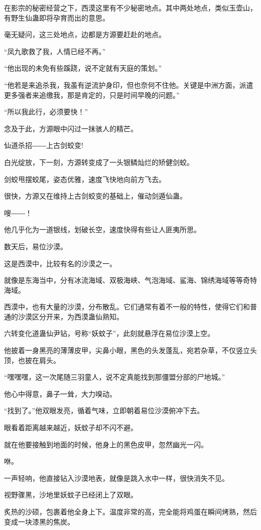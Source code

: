 \begin{this_body}
在影宗的秘密经营之下，西漠这里有不少秘密地点。其中两处地点，类似玉壶山，有野生仙蛊即将孕育而出的意思。

毫无疑问，这三处地点，边都是方源要赶赴的地点。

“凤九歌救了我，人情已经不再。”

“他出现的未免有些蹊跷，说不定就有天庭的策划。”

“他若是来追杀我，我虽有逆流护身印，但也奈何不住他。关键是中洲方面，派遣更多强者来追缴我，那是肯定的，只是时间早晚的问题。”

“所以我此行，必须要快！”

念及于此，方源眼中闪过一抹骇人的精芒。

仙道杀招――上古剑蛟变!

白光绽放，下一刻，方源转变成了一头银鳞灿烂的矫健剑蛟。

剑蛟甩摆蛟尾，姿态优雅，速度飞快地向前方飞去。

很快，方源又在维持上古剑蛟变的基础上，催动剑遁仙蛊。

嗖――！

他几乎化为一道银线，划破长空，速度快得有些让人匪夷所思。

数天后，易位沙漠。

这是西漠中，比较有名的沙漠之一。

就像是东海当中，分有冰流海域、双极海峡、气泡海域、鲨海、锦绣海域等等奇特海域。

西漠中，也有大量的沙漠，分布散乱。它们通常有着不一般的特性，使得它们和普通的沙漠区分开来，为西漠蛊仙熟知。

六转变化道蛊仙尹钻，号称“妖蚊子”，此刻就悬浮在易位沙漠上空。

他披着一身黑亮的薄薄皮甲，尖鼻小眼，黑色的头发蓬乱，宛若杂草，不仅竖立头顶，也披在肩头。

“嘿嘿嘿，这一次尾随三羽童人，说不定真能找到那僵盟分部的尸地城。”

他心中得意，鼻子一耸，大力嗅动。

“找到了。”他双眼发亮，循着气味，立即朝着易位沙漠俯冲下去。

眼看着距离越来越近，妖蚊子却不闪不避。

就在他要接触到地面的时候，他身上的黑色皮甲，忽然幽光一闪。

咻。

一声轻响，他直接钻入沙漠地表，就像是跳入水中一样，很快消失不见。

视野骤黑，沙地里妖蚊子已经闭上了双眼。

炙热的沙硕，包裹着他全身上下。温度非常的高，完全能将鸡蛋在瞬间烤熟，然后变成一块漆黑的焦炭。


\end{this_body}
